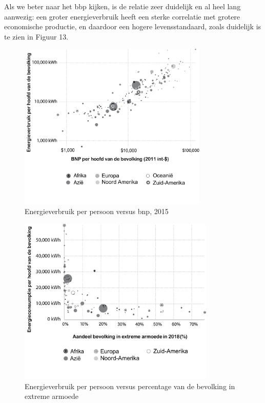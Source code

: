 Als we beter naar het bbp kijken, is de relatie zeer duidelijk en al heel lang aanwezig: een groter energieverbruik heeft een sterke correlatie met grotere economische productie, en daardoor een hogere levensstandaard, zoals duidelijk is te zien in Figuur 13.

\begin{figure}[H]
\centering
    \includegraphics[height=8cm]{figures/fig13.pdf}
    \caption[Energieverbruik per persoon versus bnp, 2015]{Energieverbruik per persoon versus bnp, 2015\footnotemark}
    \label{fig12}
\end{figure}
\autocite{101}

\begin{figure}[H]
\centering
    \includegraphics[height=8cm]{figures/fig14.pdf}
    \caption[Energieverbruik per persoon versus percentage van de bevolking in extreme armoede]{Energieverbruik per persoon versus percentage van de bevolking in extreme armoede\footnotemark}
    \label{fig12}
\end{figure}
\autocite{102}

